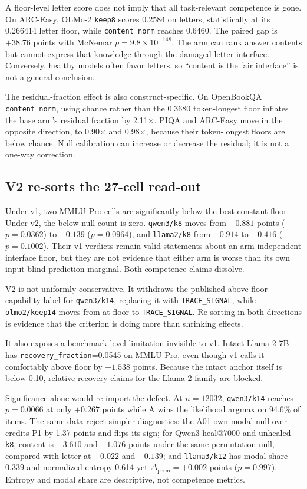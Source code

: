 A floor-level letter score does not imply that all task-relevant competence is gone. On ARC-Easy, OLMo-2 \texttt{keep8} scores 0.2584 on letters, statistically at its 0.266414 letter floor, while \texttt{content\_norm} reaches 0.6460. The paired gap is $+38.76$ points with McNemar $p=9.8\times10^{-148}$. The arm can rank answer contents but cannot express that knowledge through the damaged letter interface. Conversely, healthy models often favor letters, so ``content is the fair interface'' is not a general conclusion.

The residual-fraction effect is also construct-specific. On OpenBookQA \texttt{content\_norm}, using chance rather than the 0.3680 token-longest floor inflates the base arm's residual fraction by 2.11$\times$. PIQA and ARC-Easy move in the opposite direction, to 0.90$\times$ and 0.98$\times$, because their token-longest floors are below chance. Null calibration can increase or decrease the residual; it is not a one-way correction.

\subsection{V2 re-sorts the 27-cell read-out}

Under v1, two MMLU-Pro cells are significantly below the best-constant floor. Under v2, the below-null count is zero. \texttt{qwen3/k8} moves from $-0.881$ points ($p=0.0362$) to $-0.139$ ($p=0.0964$), and \texttt{llama2/k8} from $-0.914$ to $-0.416$ ($p=0.1002$). Their v1 verdicts remain valid statements about an arm-independent interface floor, but they are not evidence that either arm is worse than its own input-blind prediction marginal. Both competence claims dissolve.

V2 is not uniformly conservative. It withdraws the published above-floor capability label for \texttt{qwen3/k14}, replacing it with \texttt{TRACE\_SIGNAL}, while \texttt{olmo2/keep14} moves from at-floor to \texttt{TRACE\_SIGNAL}. Re-sorting in both directions is evidence that the criterion is doing more than shrinking effects.

It also exposes a benchmark-level limitation invisible to v1. Intact Llama-2-7B has \texttt{recovery\_fraction}=0.0545 on MMLU-Pro, even though v1 calls it comfortably above floor by $+1.538$ points. Because the intact anchor itself is below 0.10, relative-recovery claims for the Llama-2 family are blocked.

Significance alone would re-import the defect. At $n=12032$, \texttt{qwen3/k14} reaches $p=0.0066$ at only $+0.267$ points while A wins the likelihood argmax on 94.6\% of items. The same data reject simpler diagnostics: the A01 own-modal null over-credits P1 by 1.37 points and flips its sign; for Qwen3 heal@7000 and unhealed \texttt{k8}, content is $-3.610$ and $-1.076$ points under the same permutation null, compared with letter at $-0.022$ and $-0.139$; and \texttt{llama3/k12} has modal share 0.339 and normalized entropy 0.614 yet $\Delta_{\mathrm{perm}}=+0.002$ points ($p=0.997$). Entropy and modal share are descriptive, not competence metrics.

